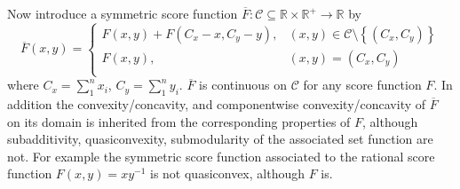 \documentclass{article}
\theoremstyle{case}
\begin{document}
Now introduce a symmetric score function $\overline{F}\colon \mathcal{C} \subseteq \mathbb{R} \times \mathbb{R}^{+} \to \mathbb{R}$ by
\[   
\overline{F}\left( x,y\right) = \left\{
\begin{array}{ll}
      F\left( x,y\right) + F\left( C_x-x, C_y-y\right), & \left( x,y\right) \in \mathcal{C} \setminus{\left\lbrace \left( C_x, C_y\right) \right\rbrace}  \\
      F\left( x,y\right), & \left( x,y\right) = \left( C_x, C_y\right)  \\
\end{array} 
\right. 
\]
where $C_x = \sum_1^n x_i$, $C_y = \sum_1^n y_i$. $\overline{F}$ is continuous on $\mathcal{C}$ for any score function $F$. In addition the convexity/concavity, and componentwise convexity/concavity of $\overline{F}$ on its domain is inherited from the corresponding properties of $F$, although subadditivity, quasiconvexity, submodularity of the associated set function are not. For example the symmetric score function associated to the rational score function $F(x,y) = xy^{-1}$ is not quasiconvex, although $F$ is.


\end{document}
